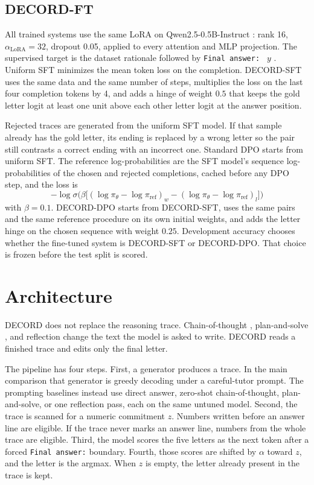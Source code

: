 \documentclass[11pt]{article}
\begin{document}
\subsection{DECORD-FT}

All trained systems use the same LoRA on Qwen2.5-0.5B-Instruct \citep{qwen2025}: rank 16, \(\alpha_{\mathrm{LoRA}}=32\), dropout 0.05, applied to every attention and MLP projection.
The supervised target is the dataset rationale followed by \texttt{Final answer: } \(y\) \citep{ling2017aqua}.
Uniform SFT minimizes the mean token loss on the completion.
DECORD-SFT uses the same data and the same number of steps, multiplies the loss on the last four completion tokens by 4, and adds a hinge of weight \(0.5\) that keeps the gold letter logit at least one unit above each other letter logit at the answer position.

Rejected traces are generated from the uniform SFT model.
If that sample already has the gold letter, its ending is replaced by a wrong letter so the pair still contrasts a correct ending with an incorrect one.
Standard DPO starts from uniform SFT.
The reference log-probabilities are the SFT model's sequence log-probabilities of the chosen and rejected completions, cached before any DPO step, and the loss is
\[
-\log\sigma\Big(\beta\big[(\log\pi_\theta-\log\pi_{\mathrm{ref}})_w-(\log\pi_\theta-\log\pi_{\mathrm{ref}})_l\big]\Big)
\]
with \(\beta=0.1\).
DECORD-DPO starts from DECORD-SFT, uses the same pairs and the same reference procedure on its own initial weights, and adds the letter hinge on the chosen sequence with weight \(0.25\).
Development accuracy chooses whether the fine-tuned system is DECORD-SFT or DECORD-DPO.
That choice is frozen before the test split is scored.

\section{Architecture}

DECORD does not replace the reasoning trace.
Chain-of-thought \citep{wei2022cot,kojima2022zeroshot}, plan-and-solve \citep{wang2023plan}, and reflection \citep{madaan2023selfrefine} change the text the model is asked to write.
DECORD reads a finished trace and edits only the final letter.

The pipeline has four steps.
First, a generator produces a trace.
In the main comparison that generator is greedy decoding under a careful-tutor prompt.
The prompting baselines instead use direct answer, zero-shot chain-of-thought, plan-and-solve, or one reflection pass, each on the same untuned model.
Second, the trace is scanned for a numeric commitment \(z\).
Numbers written before an answer line are eligible.
If the trace never marks an answer line, numbers from the whole trace are eligible.
Third, the model scores the five letters as the next token after a forced \texttt{Final answer:} boundary.
Fourth, those scores are shifted by \(\alpha\) toward \(z\), and the letter is the argmax.
When \(z\) is empty, the letter already present in the trace is kept.
\end{document}
